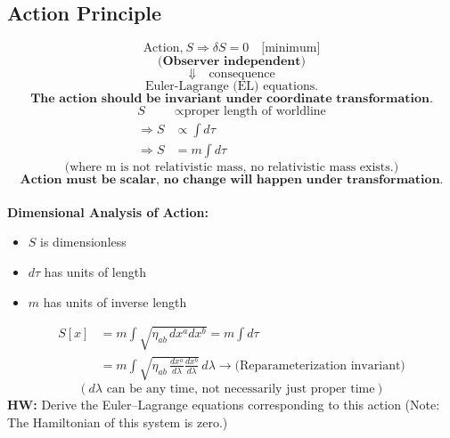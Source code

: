 \documentclass[14pt]{article} %
\begin{document}
\subsection*{Action Principle}
$$ \text{Action,}~ S \Rightarrow \delta S = 0 \quad \text{[minimum]} $$
$$ \textbf{(Observer independent)} $$
\[
\Downarrow \quad \text{consequence}
\]
$$\text{Euler-Lagrange (EL) equations.}$$
$$ \textbf{The action should be invariant under coordinate transformation.} $$
\begin{align*}
    S &\propto \text{proper length of worldline} \\
    \Rightarrow S &\propto \int d\tau \\
    \Rightarrow S &= m \int d\tau
\end{align*}
$$ \text{(where m is not relativistic mass, no relativistic mass exists.)} $$
$$\textbf{Action must be scalar, no change will happen under transformation.}$$
\\
\textbf{Dimensional Analysis of Action:}
\begin{itemize}
    \item $S$ is dimensionless
    \item $d\tau$ has units of length
    \item $m$ has units of inverse length
\end{itemize}
\begin{align*}
    S[x] &= m \int \sqrt{ \eta_{ab} \, dx^a dx^b }=m \int d \tau \\
    &= m \int \sqrt{ \eta_{ab} \, \frac{dx^a}{d\lambda} \frac{dx^b}{d\lambda} } \, d\lambda 
\rightarrow \text{(Reparameterization invariant)}
\end{align*}
$$(d\lambda\text{ can be any time, not necessarily just proper time})$$
\noindent
\textbf{HW:} \quad Derive the Euler–Lagrange equations corresponding to this action (Note: The Hamiltonian of this system is zero.)
\end{document}

